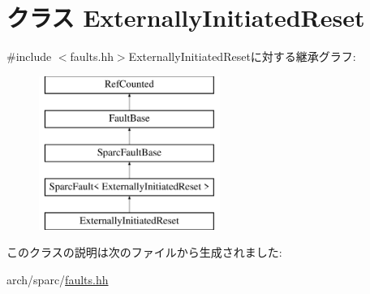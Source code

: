 \hypertarget{classSparcISA_1_1ExternallyInitiatedReset}{
\section{クラス ExternallyInitiatedReset}
\label{classSparcISA_1_1ExternallyInitiatedReset}
}


{\ttfamily \#include $<$faults.hh$>$}ExternallyInitiatedResetに対する継承グラフ:\begin{figure}[H]
\begin{center}
\leavevmode
\includegraphics[height=5cm]{classSparcISA_1_1ExternallyInitiatedReset}
\end{center}
\end{figure}


このクラスの説明は次のファイルから生成されました:\begin{DoxyCompactItemize}
\item 
arch/sparc/\hyperlink{arch_2sparc_2faults_8hh}{faults.hh}\end{DoxyCompactItemize}
